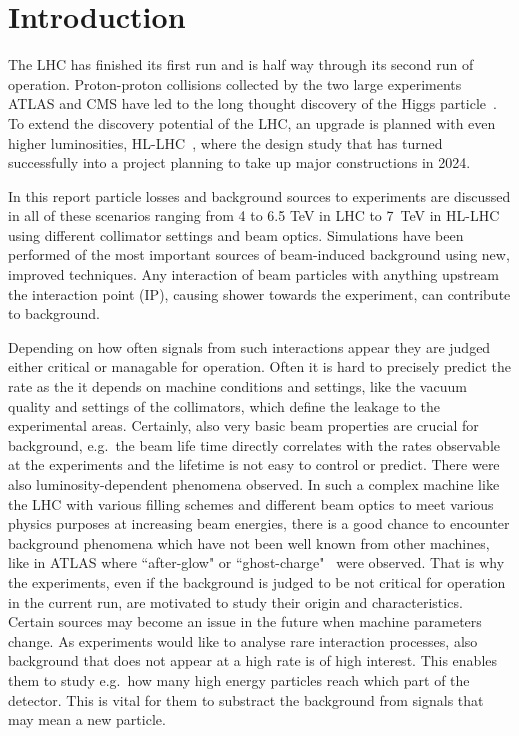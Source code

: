 \section{Introduction}


The LHC has finished its first run and is half way through its second run of operation. Proton-proton collisions collected by the two large experiments ATLAS and CMS have led to the long thought discovery of the Higgs particle~\cite{Aad20121,Chatrchyan201230}. To extend the discovery potential of the LHC, an upgrade is planned with even higher luminosities, HL-LHC~\cite{hl-lhc-prel-design}, where the design study that has turned successfully into a project planning to take up major constructions in 2024.

In this report particle losses and background sources to experiments are discussed in all of these scenarios ranging from 4 to 6.5 TeV in LHC to 7~TeV in HL-LHC using different collimator settings and beam optics. Simulations have been performed of the most important sources of beam-induced background using new, improved techniques. Any interaction of beam particles with anything upstream the interaction point (IP), causing shower towards the experiment, can contribute to background.

Depending on how often signals from such interactions appear they are judged either critical or managable for operation. Often it is hard to precisely predict the rate as the it depends on machine conditions and settings, like the vacuum quality and settings of the collimators, which define the leakage to the experimental areas. Certainly, also very basic beam properties are crucial for background, e.g.~the beam life time directly correlates with the rates observable at the experiments and the lifetime is not easy to control or predict. There were also luminosity-dependent phenomena observed. In such a complex machine like the LHC with various filling schemes and different beam optics to meet various physics purposes at increasing beam energies, there is a good chance to encounter background phenomena which have not been well known from other machines, like in ATLAS where ``after-glow" or ``ghost-charge"~\cite{ATLAS_JINST_13} were observed. That is why the experiments, even if the background is judged to be not critical for operation in the current run, are motivated to study their origin and characteristics. Certain sources may become an issue in the future when machine parameters change. As experiments would like to analyse rare interaction processes, also background that does not appear at a high rate is of high interest. This enables them to study e.g.~how many high energy particles reach which part of the detector. This is vital for them to substract the background from signals that may mean a new particle. 

